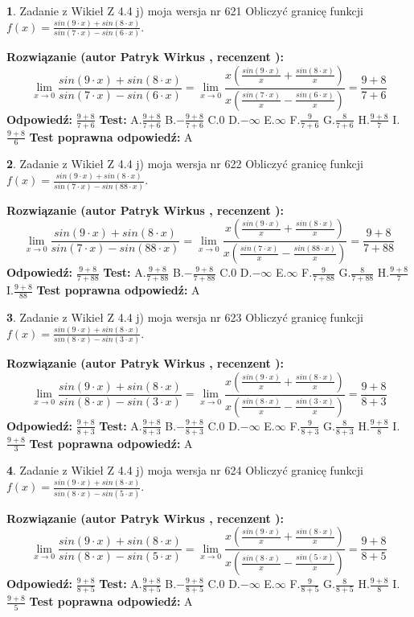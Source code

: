 \documentclass[12pt, a4paper]{article}
\theoremstyle{definition} %
\newtheorem{zad}{}
\newcommand{\zadStart}[1]{\begin{zad}#1\newline}
\newcommand{\zadStop}{\end{zad}}
\newcommand{\rozwStart}[2]{\noindent \textbf{Rozwiązanie (autor #1 , recenzent #2): }\newline}
\newcommand{\rozwStop}{\newline}
\newcommand{\odpStart}{\noindent \textbf{Odpowiedź:}\newline}
\newcommand{\odpStop}{\newline}
\newcommand{\testStart}{\noindent \textbf{Test:}\newline}
\newcommand{\testStop}{\newline}
\newcommand{\kluczStart}{\noindent \textbf{Test poprawna odpowiedź:}\newline}
\newcommand{\kluczStop}{\newline}
\begin{document}
\zadStart{Zadanie z Wikieł Z 4.4 j) moja wersja nr 621}
Obliczyć granicę funkcji $f(x)=\frac{sin(9\cdot x) +sin(8\cdot x)}{sin(7\cdot x) -sin(6\cdot x)}$.
\zadStop
\rozwStart{Patryk Wirkus}{}
$$\lim\limits_{x\to 0}\frac{sin(9\cdot x) +sin(8\cdot x)}{sin(7\cdot x) -sin(6\cdot x)}=\lim\limits_{x\to 0}\frac{x(\frac{sin(9\cdot x)}{x}+\frac{sin(8\cdot x)}{x})}{x(\frac{sin(7\cdot x)}{x}-\frac{sin(6\cdot x)}{x})}=\frac{9+8}{7+6}$$
\rozwStop
\odpStart
$\frac{9+8}{7+6}$
\odpStop
\testStart
A.$\frac{9+8}{7+6}$
B.$-\frac{9+8}{7+6}$
C.$0$
D.$-\infty$
E.$\infty$
F.$\frac{9}{7+6}$
G.$\frac{8}{7+6}$
H.$\frac{9+8}{7}$
I.$\frac{9+8}{6}$
\testStop
\kluczStart
A
\kluczStop



\zadStart{Zadanie z Wikieł Z 4.4 j) moja wersja nr 622}
Obliczyć granicę funkcji $f(x)=\frac{sin(9\cdot x) +sin(8\cdot x)}{sin(7\cdot x) -sin(88\cdot x)}$.
\zadStop
\rozwStart{Patryk Wirkus}{}
$$\lim\limits_{x\to 0}\frac{sin(9\cdot x) +sin(8\cdot x)}{sin(7\cdot x) -sin(88\cdot x)}=\lim\limits_{x\to 0}\frac{x(\frac{sin(9\cdot x)}{x}+\frac{sin(8\cdot x)}{x})}{x(\frac{sin(7\cdot x)}{x}-\frac{sin(88\cdot x)}{x})}=\frac{9+8}{7+88}$$
\rozwStop
\odpStart
$\frac{9+8}{7+88}$
\odpStop
\testStart
A.$\frac{9+8}{7+88}$
B.$-\frac{9+8}{7+88}$
C.$0$
D.$-\infty$
E.$\infty$
F.$\frac{9}{7+88}$
G.$\frac{8}{7+88}$
H.$\frac{9+8}{7}$
I.$\frac{9+8}{88}$
\testStop
\kluczStart
A
\kluczStop



\zadStart{Zadanie z Wikieł Z 4.4 j) moja wersja nr 623}
Obliczyć granicę funkcji $f(x)=\frac{sin(9\cdot x) +sin(8\cdot x)}{sin(8\cdot x) -sin(3\cdot x)}$.
\zadStop
\rozwStart{Patryk Wirkus}{}
$$\lim\limits_{x\to 0}\frac{sin(9\cdot x) +sin(8\cdot x)}{sin(8\cdot x) -sin(3\cdot x)}=\lim\limits_{x\to 0}\frac{x(\frac{sin(9\cdot x)}{x}+\frac{sin(8\cdot x)}{x})}{x(\frac{sin(8\cdot x)}{x}-\frac{sin(3\cdot x)}{x})}=\frac{9+8}{8+3}$$
\rozwStop
\odpStart
$\frac{9+8}{8+3}$
\odpStop
\testStart
A.$\frac{9+8}{8+3}$
B.$-\frac{9+8}{8+3}$
C.$0$
D.$-\infty$
E.$\infty$
F.$\frac{9}{8+3}$
G.$\frac{8}{8+3}$
H.$\frac{9+8}{8}$
I.$\frac{9+8}{3}$
\testStop
\kluczStart
A
\kluczStop



\zadStart{Zadanie z Wikieł Z 4.4 j) moja wersja nr 624}
Obliczyć granicę funkcji $f(x)=\frac{sin(9\cdot x) +sin(8\cdot x)}{sin(8\cdot x) -sin(5\cdot x)}$.
\zadStop
\rozwStart{Patryk Wirkus}{}
$$\lim\limits_{x\to 0}\frac{sin(9\cdot x) +sin(8\cdot x)}{sin(8\cdot x) -sin(5\cdot x)}=\lim\limits_{x\to 0}\frac{x(\frac{sin(9\cdot x)}{x}+\frac{sin(8\cdot x)}{x})}{x(\frac{sin(8\cdot x)}{x}-\frac{sin(5\cdot x)}{x})}=\frac{9+8}{8+5}$$
\rozwStop
\odpStart
$\frac{9+8}{8+5}$
\odpStop
\testStart
A.$\frac{9+8}{8+5}$
B.$-\frac{9+8}{8+5}$
C.$0$
D.$-\infty$
E.$\infty$
F.$\frac{9}{8+5}$
G.$\frac{8}{8+5}$
H.$\frac{9+8}{8}$
I.$\frac{9+8}{5}$
\testStop
\kluczStart
A
\kluczStop
\end{document}
